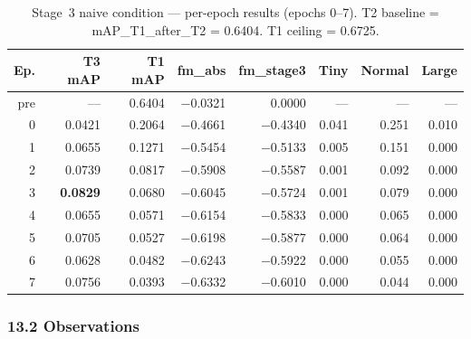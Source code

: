 \begin{table}[h]
\centering
\caption{Stage~3 naive condition — per-epoch results (epochs 0--7).
T2 baseline = mAP\_T1\_after\_T2 = 0.6404. T1 ceiling = 0.6725.}
\label{tab:s3_naive_early}
\small
\begin{tabular}{rrrrrrrr}
\hline
\textbf{Ep.} & \textbf{T3 mAP} & \textbf{T1 mAP} & \textbf{fm\_abs} & \textbf{fm\_stage3} & \textbf{Tiny} & \textbf{Normal} & \textbf{Large} \\
\hline
pre & — & 0.6404 & $-$0.0321 & 0.0000 & — & — & — \\
0  & 0.0421 & 0.2064 & $-$0.4661 & $-$0.4340 & 0.041 & 0.251 & 0.010 \\
1  & 0.0655 & 0.1271 & $-$0.5454 & $-$0.5133 & 0.005 & 0.151 & 0.000 \\
2  & 0.0739 & 0.0817 & $-$0.5908 & $-$0.5587 & 0.001 & 0.092 & 0.000 \\
3  & \textbf{0.0829} & 0.0680 & $-$0.6045 & $-$0.5724 & 0.001 & 0.079 & 0.000 \\
4  & 0.0655 & 0.0571 & $-$0.6154 & $-$0.5833 & 0.000 & 0.065 & 0.000 \\
5  & 0.0705 & 0.0527 & $-$0.6198 & $-$0.5877 & 0.000 & 0.064 & 0.000 \\
6  & 0.0628 & 0.0482 & $-$0.6243 & $-$0.5922 & 0.000 & 0.055 & 0.000 \\
7  & 0.0756 & 0.0393 & $-$0.6332 & $-$0.6010 & 0.000 & 0.044 & 0.000 \\
\hline
\end{tabular}
\end{table}

\subsubsection*{13.2 Observations}

